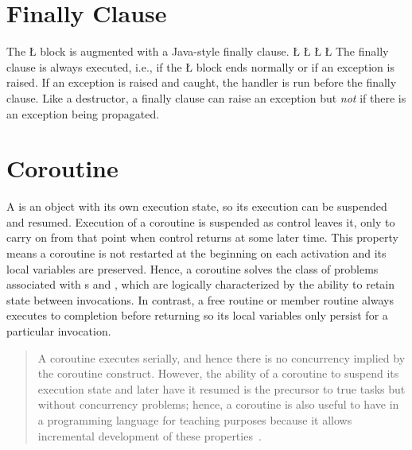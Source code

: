 \documentclass[openright,twoside]{report}
\begin{document}
\section{Finally Clause}
\label{s:FinallyClause}

The \CC \LGinlinetrue\LGbegin\lgrinde\L{}\endlgrinde\LGend{} block is augmented with a Java-style finally clause.
\LGinlinefalse\LGbegin\lgrinde
\L{}
\L{\LB{}}
\L{}
\CE{}\L{}
\endlgrinde\LGend
The finally clause is always executed, i.e., if the \LGinlinetrue\LGbegin\lgrinde\L{}\endlgrinde\LGend{} block ends normally or if an exception is raised.
If an exception is raised and caught, the handler is run before the finally clause.
Like a destructor, a finally clause can raise an exception but \emph{not} if there is an exception being propagated.


\section{Coroutine}
\label{s:Coroutine}

A  is an object with its own execution state, so its execution can be suspended and resumed.
Execution of a coroutine is suspended as control leaves it, only to carry on from that point when control returns at some later time.
This property means a coroutine is not restarted at the beginning on each activation and its local variables are preserved.
Hence, a coroutine solves the class of problems associated with s and , which are logically characterized by the ability to retain state between invocations.
In contrast, a free routine or member routine always executes to completion before returning so its local variables only persist for a particular invocation.
\begin{quote}
A coroutine executes serially, and hence there is no concurrency implied by the coroutine construct.
However, the ability of a coroutine to suspend its execution state and later have it resumed is the precursor to true tasks but without concurrency problems;
hence, a coroutine is also useful to have in a programming language for teaching purposes because it allows incremental development of these properties~\cite{Yeager91}.
\end{quote}
\end{document}
